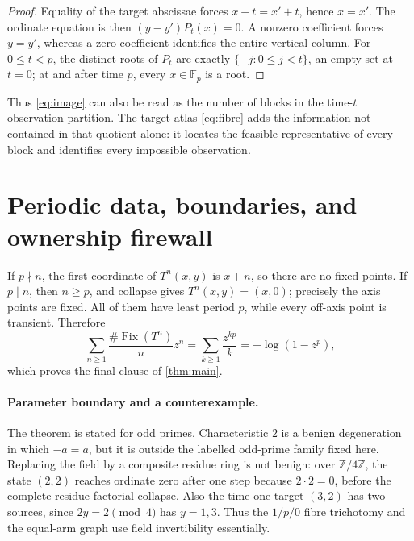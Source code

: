 \documentclass[10pt,a4paper]{amsart}
\theoremstyle{remark}
\newcommand{\F}{\mathbb F}
\newcommand{\Fix}{\operatorname{Fix}}
\begin{document}
\begin{proof}
Equality of the target abscissae forces \(x+t=x'+t\), hence \(x=x'\).
The ordinate equation is then
\((y-y')P_t(x)=0\).  A nonzero coefficient forces \(y=y'\), whereas a zero
coefficient identifies the entire vertical column.  For \(0\leq t<p\), the
distinct roots of \(P_t\) are exactly
\(\{-j:0\leq j<t\}\), an empty set at \(t=0\); at and after time \(p\), every
\(x\in\F_p\) is a root.
\end{proof}

Thus \eqref{eq:image} can also be read as the number of blocks in the
time-\(t\) observation partition.  The target atlas \eqref{eq:fibre} adds the
information not contained in that quotient alone: it locates the feasible
representative of every block and identifies every impossible observation.

\section{Periodic data, boundaries, and ownership firewall}

If \(p\nmid n\), the first coordinate of \(T^n(x,y)\) is \(x+n\), so there
are no fixed points.  If \(p\mid n\), then \(n\geq p\), and collapse gives
\(T^n(x,y)=(x,0)\); precisely the axis points are fixed.  All of them have
least period \(p\), while every off-axis point is transient.  Therefore
\[
\sum_{n\geq1}\frac{\#\Fix(T^n)}{n}z^n
=\sum_{k\geq1}\frac{z^{kp}}{k}
=-\log(1-z^p),
\]
which proves the final clause of \cref{thm:main}.

\paragraph{Parameter boundary and a counterexample.}
The theorem is stated for odd primes.  Characteristic \(2\) is a benign
degeneration in which \(-a=a\), but it is outside the labelled odd-prime
family fixed here.  Replacing the field by a composite residue ring is not
benign: over \(\mathbb Z/4\mathbb Z\), the state \((2,2)\) reaches ordinate
zero after one step because \(2\cdot2=0\), before the complete-residue
factorial collapse.  Also the time-one target \((3,2)\) has two sources,
since \(2y=2\pmod4\) has \(y=1,3\).  Thus the \(1/p/0\) fibre trichotomy and
the equal-arm graph use field invertibility essentially.
\end{document}
